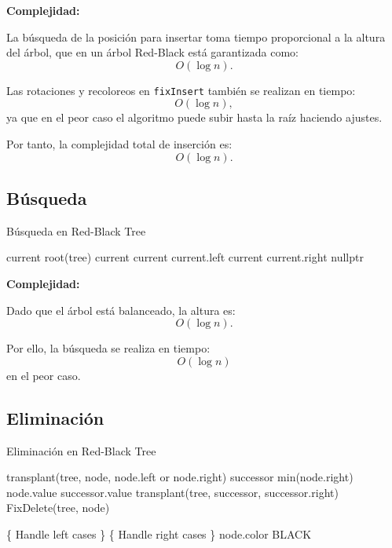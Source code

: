 \documentclass[conference]{IEEEtran}
\begin{document}
\textbf{Complejidad:}

La búsqueda de la posición para insertar toma tiempo proporcional a la altura del árbol, que en un árbol Red-Black está garantizada como:
\[
O(\log n).
\]

Las rotaciones y recoloreos en \texttt{fixInsert} también se realizan en tiempo:
\[
O(\log n),
\]
ya que en el peor caso el algoritmo puede subir hasta la raíz haciendo ajustes.

Por tanto, la complejidad total de inserción es:
\[
O(\log n).
\]

\subsection{Búsqueda}

\begin{algorithm}
\caption{Búsqueda en Red-Black Tree}
\begin{algorithmic}[1]
    \State current \textleftarrow root(tree)
            \State \Return current
            \State current \textleftarrow current.left
        \Else
            \State current \textleftarrow current.right
        \EndIf
    \EndWhile
    \State \Return nullptr
\EndFunction
\end{algorithmic}
\end{algorithm}

\textbf{Complejidad:}

Dado que el árbol está balanceado, la altura es: 
\[
O(\log n).
\]

Por ello, la búsqueda se realiza en tiempo: 
\[
O(\log n)
\]
en el peor caso.

\subsection{Eliminación}

\begin{algorithm}
\caption{Eliminación en Red-Black Tree}
\begin{algorithmic}[1]
        \State transplant(tree, node, node.left or node.right)
    \Else
        \State successor \textleftarrow min(node.right)
        \State node.value \textleftarrow successor.value
        \State transplant(tree, successor, successor.right)
    \EndIf
    \State FixDelete(tree, node)
\EndProcedure

            \State \{ Handle left cases \}
        \Else
            \State \{ Handle right cases \}
        \EndIf
    \EndWhile
    \State node.color \textleftarrow BLACK
\EndProcedure

\end{algorithmic}
\end{algorithm}
\end{document}
